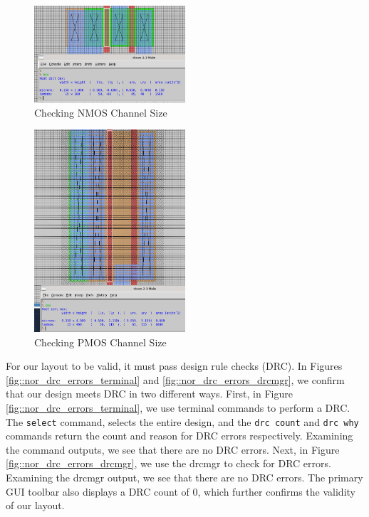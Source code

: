 \documentclass{article}
\begin{document}
	\begin{figure}[H]
		\centerline{\includegraphics[width=0.5\textwidth]{nor_nmos_channel_sizing.png}}
		\caption{Checking NMOS Channel Size}
		\label{fig::nor_nmos_channel_sizing}
	\end{figure}
	
	\begin{figure}[H]
		\centerline{\includegraphics[width=0.5\textwidth]{nor_pmos_channel_sizing.png}}
		\caption{Checking PMOS Channel Size}
		\label{fig::nor_pmos_channel_sizing}
	\end{figure}
	
	For our layout to be valid, it must pass design rule checks (DRC). In Figures \ref{fig::nor_drc_errors_terminal} and \ref{fig::nor_drc_errors_drcmgr}, we confirm that our design meets DRC in two different ways. First, in Figure \ref{fig::nor_drc_errors_terminal}, we use terminal commands to perform a DRC. The \texttt{select} command, selects the entire design, and the \texttt{drc count} and \texttt{drc why} commands return the count and reason for DRC errors respectively. Examining the command outputs, we see that there are no DRC errors. Next, in Figure \ref{fig::nor_drc_errors_drcmgr}, we use the drcmgr to check for DRC errors. Examining the drcmgr output, we see that there are no DRC errors. The primary GUI toolbar also displays a DRC count of 0, which further confirms the validity of our layout.
	
\end{document}
